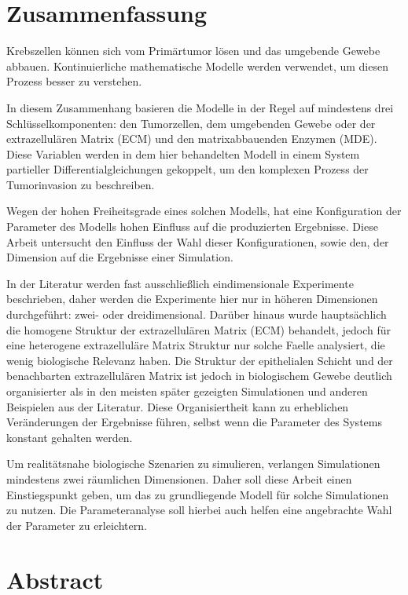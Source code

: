 \section*{Zusammenfassung}

Krebszellen können sich vom Primärtumor lösen und das umgebende Gewebe abbauen. 
Kontinuierliche mathematische Modelle werden verwendet, um diesen Prozess besser zu verstehen.

In diesem Zusammenhang basieren die Modelle in der Regel auf mindestens drei Schlüsselkomponenten: den Tumorzellen, dem umgebenden Gewebe oder der extrazellulären Matrix (ECM) und den matrixabbauenden Enzymen (MDE). Diese Variablen werden in dem hier behandelten Modell in einem System partieller Differentialgleichungen gekoppelt, um den komplexen Prozess der Tumorinvasion zu beschreiben.

Wegen der hohen Freiheitsgrade eines solchen Modells, hat eine Konfiguration der Parameter des Modells hohen Einfluss auf die produzierten Ergebnisse. Diese Arbeit untersucht den Einfluss der Wahl dieser Konfigurationen, sowie den, der Dimension auf die Ergebnisse einer Simulation.

In der Literatur werden fast ausschließlich eindimensionale Experimente beschrieben, daher werden die Experimente hier nur in höheren Dimensionen durchgeführt: zwei- oder dreidimensional. Darüber hinaus wurde hauptsächlich die homogene Struktur der extrazellulären Matrix (ECM) behandelt, jedoch für eine heterogene extrazelluläre Matrix Struktur nur solche Faelle analysiert, die wenig biologische Relevanz haben. Die Struktur der epithelialen Schicht und der benachbarten extrazellulären Matrix ist jedoch in biologischem Gewebe deutlich organisierter als in den meisten später gezeigten Simulationen und anderen Beispielen aus der Literatur. Diese Organisiertheit kann zu erheblichen Veränderungen der Ergebnisse führen, selbst wenn die Parameter des Systems konstant gehalten werden.

Um realitätsnahe biologische Szenarien zu simulieren, verlangen Simulationen mindestens zwei räumlichen Dimensionen. Daher soll diese Arbeit einen Einstiegspunkt geben, um das zu grundliegende Modell für solche Simulationen zu nutzen. Die Parameteranalyse soll hierbei auch helfen eine angebrachte Wahl der Parameter zu erleichtern.

\clearpage
\section*{Abstract}

